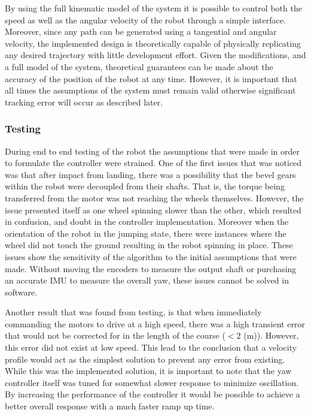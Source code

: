 \documentclass[ece]{uw-wkrpt}
\begin{document}
By using the full kinematic model of the system it is possible to control both the speed as well as the angular velocity of the robot through a simple interface. Moreover, since any path can be generated using a tangential and angular velocity, the implemented design is theoretically capable of physically replicating any desired trajectory with little development effort. Given the modifications, and a full model of the system, theoretical guarantees can be made about the accuracy of the position of the robot at any time. However, it is important that all times the assumptions of the system must remain valid otherwise significant tracking error will occur as described later.

\subsubsection{Testing}

During end to end testing of the robot the assumptions that were made in order to formulate the controller were strained. One of the first issues that was noticed was that after impact from landing, there was a possibility that the bevel gears within the robot were decoupled from their shafts. That is, the torque being transferred from the motor was not reaching the wheels themselves. However, the issue presented itself as one wheel spinning slower than the other, which resulted in confusion, and doubt in the controller implementation. Moreover when the orientation of the robot in the jumping state, there were instances where the wheel did not touch the ground resulting in the robot spinning in place. These issues show the sensitivity of the algorithm to the initial assumptions that were made. Without moving the encoders to measure the output shaft or purchasing an accurate IMU to measure the overall yaw, these issues cannot be solved in software. 

Another result that was found from testing, is that when immediately commanding the motors to drive at a high speed, there was a high transient error that would not be corrected for in the length of the course ($<2$ (m)). However, this error did not exist at low speed. This lead to the conclusion that a velocity profile would act as the simplest solution to prevent any error from existing. While this was the implemented solution, it is important to note that the yaw controller itself was tuned for somewhat slower response to minimize oscillation. By increasing the performance of the controller it would be possible to achieve a better overall response with a much faster ramp up time. 
\end{document}
